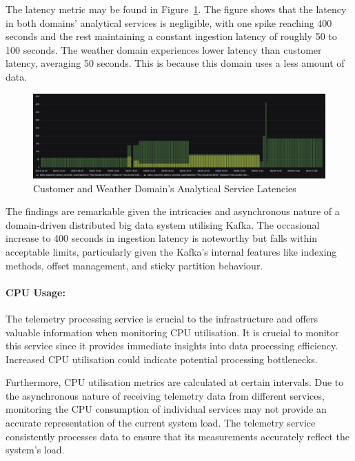 \documentclass[preprint,12pt]{elsarticle}
\begin{document}
The latency metric may be found in Figure~\ref{cusetomerAndWeatherDomainAnalyaticalServicesLatencies}. The figure shows that the latency in both domains' analytical services is negligible, with one spike reaching 400 seconds and the rest maintaining a constant ingestion latency of roughly 50 to 100 seconds. The weather domain experiences lower latency than customer latency, averaging 50 seconds. This is because this domain uses a less amount of data.

\begin{figure}[h!]
  \centering
  \includegraphics[width=\textwidth]{images/customer-and-weather-domain-analytics-service-latency.png}
  \caption{Customer and Weather Domain's Analytical Service Latencies}
  \label{cusetomerAndWeatherDomainAnalyaticalServicesLatencies}
\end{figure}

The findings are remarkable given the intricacies and asynchronous nature of a domain-driven distributed big data system utilising Kafka. The occasional increase to 400 seconds in ingestion latency is noteworthy but falls within acceptable limits, particularly given the Kafka's internal features like indexing methods, offset management, and sticky partition behaviour.

\paragraph{CPU Usage:} \label{cpuUsageInS1}   

The telemetry processing service is crucial to the infrastructure and offers valuable information when monitoring CPU utilisation. It is crucial to monitor this service since it provides immediate insights into data processing efficiency. Increased CPU utilisation could indicate potential processing bottlenecks. 

Furthermore, CPU utilisation metrics are calculated at certain intervals. Due to the asynchronous nature of receiving telemetry data from different services, monitoring the CPU consumption of individual services may not provide an accurate representation of the current system load. The telemetry service consistently processes data to ensure that its measurements accurately reflect the system's load. 
\end{document}
